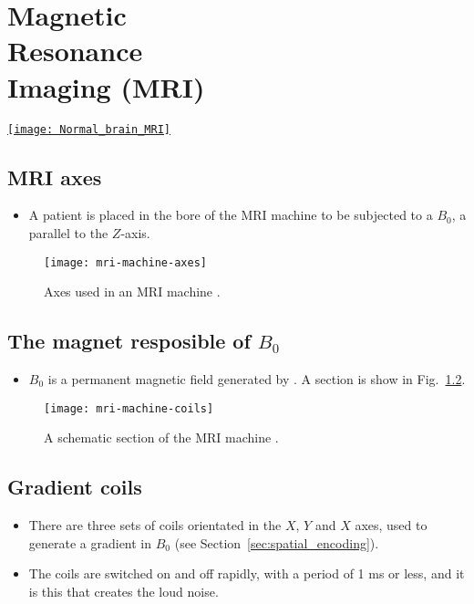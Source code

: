 \chapter{Magnetic\\Resonance\\Imaging (MRI)}
\vspace{-50ex}
\begin{flushright}
\href{https://www.sciencephoto.com/media/728494/view/normal-brain-mri}{\texttt{[image: Normal\_brain\_MRI]}}
\end{flushright}

\section{MRI axes}
\begin{itemize}
\item A patient is placed in the bore of the MRI machine to be
  subjected to a $B_0$, a  parallel to the $Z$-axis.
\end{itemize}
\vspace{-4ex}
\begin{figure}[!b]
  \centering
  \texttt{[image: mri-machine-axes]}
  \caption{Axes used in an MRI machine \cite{abdulla2025MRI_machine}.}
  \label{fig:MRI_axes}
\end{figure}

\section{The magnet resposible of $B_0$}
\begin{itemize}
\item $B_0$ is a permanent magnetic field generated by . A section is
  show in Fig.~\ref{fig:MRI_machine_scheme}.
\end{itemize}
\vspace{-4ex}
\begin{figure}[!b]
  \centering
  \texttt{[image: mri-machine-coils]}
  \caption{A schematic section of the MRI machine \cite{abdulla2025MRI_machine}.}
  \label{fig:MRI_machine_scheme}
\end{figure}

\section{Gradient coils}
\begin{itemize}
\item There are three sets of coils orientated in the $X$, $Y$ and $X$
  axes, used to generate a gradient in $B_0$ (see
  Section~\ref{sec:spatial_encoding}).
\item The coils are switched on and off rapidly, with a period of 1 ms
  or less, and it is this that creates the loud noise.
\end{itemize}

